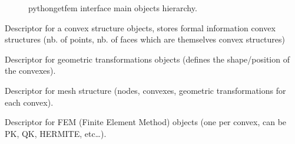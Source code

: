 \documentclass[a4paper,11pt,english]{sphinxmanual}
\begin{document}
\begin{figure}[htbp]
\centering
\capstart

\noindent{}
\caption{python\sphinxhyphen{}getfem interface main objects hierarchy.}\label{\detokenize{python/pygf:id1}}\end{figure}

\begin{fulllineitems}
\label{\detokenize{python/pygf:CvStruct}}
Descriptor for a convex structure objects, stores formal information convex
structures (nb. of points, nb. of faces which are themselves convex
structures)

\end{fulllineitems}


\begin{fulllineitems}
\label{\detokenize{python/pygf:GeoTrans}}
Descriptor for geometric transformations objects (defines the shape/position
of the convexes).

\end{fulllineitems}


\begin{fulllineitems}
\label{\detokenize{python/pygf:Mesh}}
Descriptor for mesh structure (nodes, convexes, geometric transformations for
each convex).

\end{fulllineitems}


\begin{fulllineitems}
\label{\detokenize{python/pygf:Fem}}
Descriptor for FEM (Finite Element Method) objects (one per convex, can be
PK, QK, HERMITE, etc…).

\end{fulllineitems}
\end{document}
